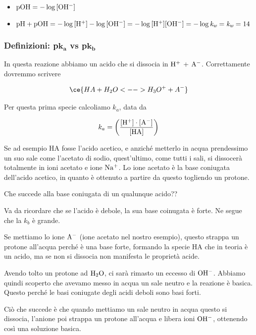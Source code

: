 \begin{itemize}
    \item $\rm pOH=-\log{[OH^-]}$
    \item $\rm pH + pOH=-\log{[H^+]} - \log{[OH^-]}=-\log{[H^+][OH^-]}=-\log{\textit{k}_{\textit{w}}}=\textit{k}_{\textit{w}}=14$
\end{itemize}

\subsubsection{Definizioni: p$\boldsymbol{k_a}$ vs p$\boldsymbol{k_b}$}


In questa reazione abbiamo un acido che si dissocia in $\rm H^+$ + $\rm A^-$. Correttamente dovremmo scrivere

$$\ce{HA + H_2O <--> H_3O^+ + A^-}$$

Per questa prima specie calcoliamo $k_a$, data da

$$k_a = \left( \rm \frac{[H^+] \cdot [A^-]}{[HA]} \right)$$

Se ad esempio HA fosse l'acido acetico, e anziché metterlo in acqua prendessimo un suo sale come l'acetato di sodio, quest'ultimo, come tutti i sali, si dissocerà totalmente in ioni acetato e ione $\rm Na^+$. Lo ione acetato è la base coniugata dell'acido acetico, in quanto è ottenuto a partire da questo togliendo un protone.

Che succede alla base coniugata di un qualunque acido??

Va da ricordare che se l'acido è debole, la sua base coinugata è forte. Ne segue che la $k_b$ è grande.

\vspace{0.2cm}

\vspace{0.2cm}Se mettiamo lo ione $\rm A^-$ (ione acetato nel nostro esempio), questo strappa un protone all'acqua perché è una base forte, formando la specie HA che in teoria è un acido, ma se non si dissocia non manifesta le proprietà acide.

Avendo tolto un protone ad $\rm H_2O$, ci sarà rimasto un eccesso di $\rm OH^-$. Abbiamo quindi scoperto che avevamo messo in acqua un sale neutro e la reazione è basica. Questo perché le basi coniugate degli acidi deboli sono basi forti.

Ciò che succede è che quando mettiamo un sale neutro in acqua questo si dissocia, l'anione poi strappa un protone all'acqua e libera ioni $\rm OH^-$, ottenendo così una soluzione basica.

